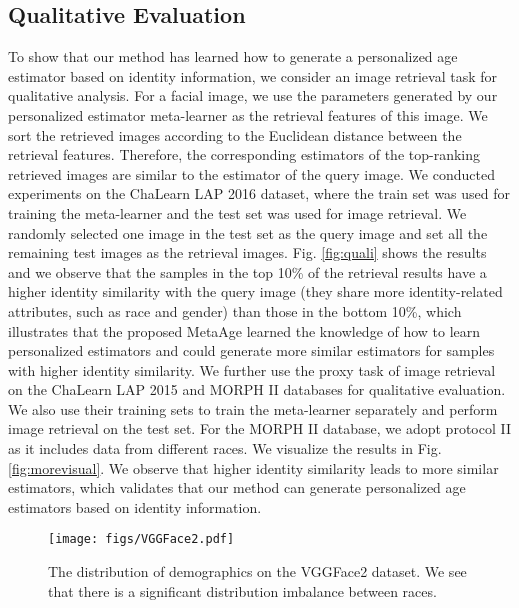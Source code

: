 \documentclass[journal,twoside]{IEEEtran}
\begin{document}
\subsection{Qualitative Evaluation}
To show that our method has learned how to generate a personalized age estimator based on identity information, we consider an image retrieval task for qualitative analysis.
For a facial image, we use the parameters  generated by our personalized estimator meta-learner as the retrieval features of this image. We sort the retrieved images according to the Euclidean distance between the retrieval features. Therefore, the corresponding estimators of the top-ranking retrieved images are similar to the estimator of the query image. We conducted experiments on the ChaLearn LAP 2016 dataset, where the train set was used for training the meta-learner and the test set was used for image retrieval. We randomly selected one image in the test set as the query image and set all the remaining test images as the retrieval images. Fig. \ref{fig:quali} shows the results and we observe that the samples in the top 10\% of the retrieval results have a higher identity similarity with the query image (they share more identity-related attributes, such as race and gender) than those in the bottom 10\%, which illustrates that the proposed MetaAge learned the knowledge of how to learn personalized estimators and could generate more similar estimators for samples with higher identity similarity. 
We further use the proxy task of image retrieval on the ChaLearn LAP 2015 and MORPH II databases for qualitative evaluation. We also use their training sets to train the meta-learner separately and perform image retrieval on the test set. For the MORPH II database, we adopt protocol II as it includes data from different races. We visualize the results in Fig. \ref{fig:morevisual}. We observe that higher identity similarity leads to more similar estimators, which validates that our method can generate personalized age estimators based on identity information. 

\begin{figure}[t]
  \begin{center}
     \texttt{[image: figs/VGGFace2.pdf]}
  \end{center}
     \caption{The distribution of demographics on the VGGFace2 dataset. We see that there is a significant distribution imbalance between races.}
  \label{fig:vggface2}
\end{figure}
\end{document}
